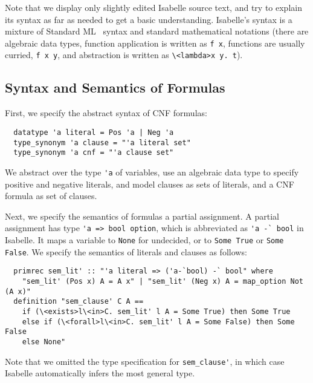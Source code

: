 \documentclass{llncs}
\newcommand{\isai}{\lstinline[language=isabelle,basicstyle=\normalsize\ttfamily\slshape]}
\begin{document}
Note that we display only slightly edited Isabelle source text, and try to explain its syntax as far as needed to get a basic understanding.
Isabelle's syntax is a mixture of Standard ML~\cite{MHMT97} syntax and standard mathematical notations (\eg there are algebraic data types, function application is written as 
\isai$f x$, functions are usually curried, \eg \isai$f x y$, and abstraction is written as \isai$\<lambda>x y. t$).


\subsection{Syntax and Semantics of Formulas}
First, we specify the abstract syntax of CNF formulas:
\begin{lstlisting}
  datatype 'a literal = Pos 'a | Neg 'a
  type_synonym 'a clause = "'a literal set"
  type_synonym 'a cnf = "'a clause set"
\end{lstlisting}
We abstract over the type \isai$'a$ of variables, use an algebraic data type to specify positive and negative literals, and model clauses 
as sets of literals, and a CNF formula as set of clauses. 
% 
% 

Next, we specify the semantics of formulas \wrt a partial assignment. A partial assignment has 
type \isai{'a => bool option}, which is abbreviated as \isai{'a -` bool} in Isabelle. 
It maps a variable to \isai{None} for undecided, or to \isai{Some True} or \isai{Some False}.
We specify the semantics of literals and clauses as follows:
\begin{lstlisting}
  primrec sem_lit' :: "'a literal => ('a-`bool) -` bool" where
    "sem_lit' (Pos x) A = A x" | "sem_lit' (Neg x) A = map_option Not (A x)"
  definition "sem_clause' C A ==
    if (\<exists>l\<in>C. sem_lit' l A = Some True) then Some True
    else if (\<forall>l\<in>C. sem_lit' l A = Some False) then Some False
    else None"
\end{lstlisting}
Note that we omitted the type specification for \isai{sem_clause'}, in which case Isabelle automatically infers the most general type.
\end{document}
